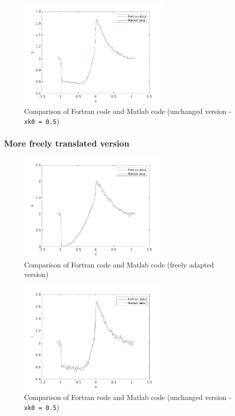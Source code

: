 \documentclass[../main/main.tex]{subfiles}
\begin{document}
\begin{figure}[!htp]
\centering
\includegraphics[width=0.65\textwidth]{../../two_resonance_lines/figures/compare_Matlab_Fortran_literally_0005.png}
\caption{Comparison of Fortran code and Matlab code (unchanged version - \texttt{xk0 = 0.5})}
\label{variance_reduction_test}
\end{figure}



\newpage
\subsubsection{More freely translated version}

\begin{figure}[!htp]
\centering
\includegraphics[width=0.65\textwidth]{../../two_resonance_lines/figures/compare_Matlab_Fortran_more_freely.png}
\caption{Comparison of Fortran code and Matlab code (freely adapted version)}
\label{variance_reduction_test}
\end{figure}

\begin{figure}[!htp]
\centering
\includegraphics[width=0.65\textwidth]{../../two_resonance_lines/figures/compare_Matlab_Fortran_more_freely_0005.png}
\caption{Comparison of Fortran code and Matlab code (unchanged version - \texttt{xk0 = 0.5})}
\label{variance_reduction_test}
\end{figure}
\end{document}
